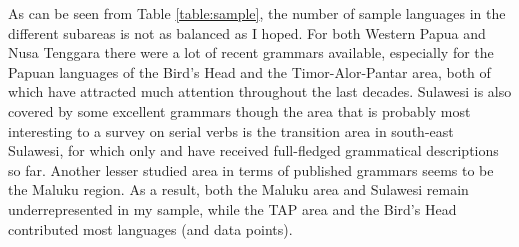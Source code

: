 As can be seen from Table \ref{table:sample}, the number of sample languages in the different subareas is not as balanced as I hoped. For both Western Papua and Nusa Tenggara there were a lot of recent grammars available, especially for the Papuan languages of the Bird's Head and the Timor-Alor-Pantar area, both of which have attracted much attention throughout the last decades. Sulawesi is also covered by some excellent grammars though the area that is probably most interesting to a survey on serial verbs is the transition area in south-east Sulawesi, for which only  \citep{vandenberg1989} and  \citep{donohue1999} have received full-fledged grammatical descriptions so far. Another lesser studied area in terms of published grammars seems to be the Maluku region. As a result, both the Maluku area and Sulawesi remain underrepresented in my sample, while the TAP area and the Bird's Head contributed most languages (and data points).

